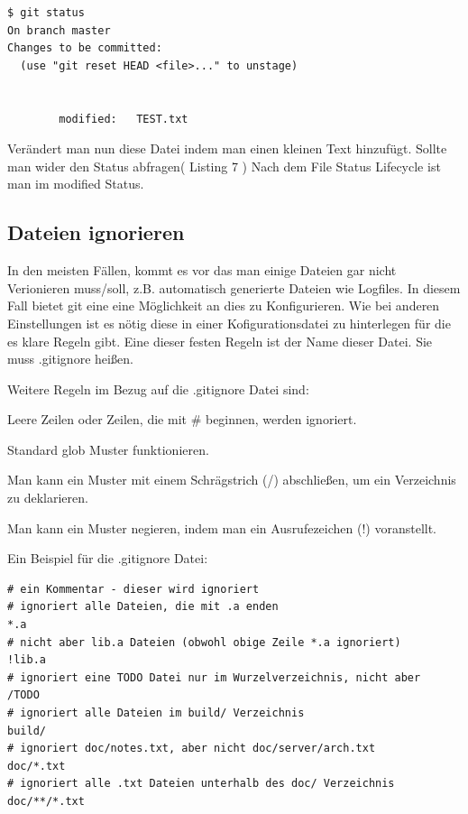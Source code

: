 \documentclass[12pt,a4paper,bibliography=totocnumbered,listof=totocnumbered]{scrartcl}
\begin{document}
\vspace{1em}
\begin{lstlisting}[caption=Git Statusbefehl nachdem verändern einer Datei, label=lst:arduino]
$ git status
On branch master
Changes to be committed:
  (use "git reset HEAD <file>..." to unstage)

      
        modified:   TEST.txt

\end{lstlisting}
Verändert man nun diese Datei indem man einen kleinen Text hinzufügt. Sollte man wider den Status abfragen( Listing 7 )
Nach dem File Status Lifecycle ist man im modified Status. 

\subsection{ Dateien ignorieren}
In den meisten Fällen, kommt es vor das man einige Dateien gar nicht Verionieren muss/soll, z.B. automatisch generierte Dateien wie Logfiles. In diesem Fall bietet git eine eine Möglichkeit an dies zu Konfigurieren. Wie bei anderen Einstellungen ist es nötig diese in einer Kofigurationsdatei zu hinterlegen für die es klare Regeln gibt. Eine dieser festen Regeln ist der Name dieser Datei. 
Sie muss .gitignore heißen.

Weitere Regeln im Bezug auf die .gitignore Datei sind:

\begin{compactitem}
	\item Leere Zeilen oder Zeilen, die mit # beginnen, werden ignoriert.
	\item Standard glob Muster funktionieren.
	\item Man kann ein Muster mit einem Schrägstrich (/) abschließen, um ein Verzeichnis zu deklarieren.
	\item  Man kann ein Muster negieren, indem man ein Ausrufezeichen (!) voranstellt.
\end{compactitem}

Ein Beispiel für die .gitignore Datei:
\vspace{1em}
\begin{lstlisting}[caption=Git Einstellungen der.gitignore Datei, label=lst:arduino]
# ein Kommentar - dieser wird ignoriert
# ignoriert alle Dateien, die mit .a enden
*.a
# nicht aber lib.a Dateien (obwohl obige Zeile *.a ignoriert)
!lib.a
# ignoriert eine TODO Datei nur im Wurzelverzeichnis, nicht aber
/TODO
# ignoriert alle Dateien im build/ Verzeichnis
build/
# ignoriert doc/notes.txt, aber nicht doc/server/arch.txt
doc/*.txt
# ignoriert alle .txt Dateien unterhalb des doc/ Verzeichnis
doc/**/*.txt
\end{lstlisting}
\end{document}
